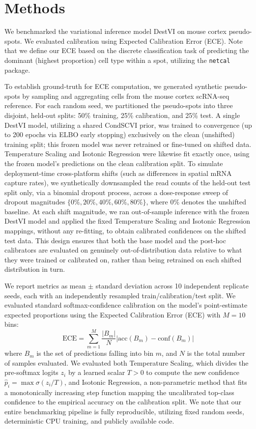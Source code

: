 \documentclass[pmlr,twocolumn,10pt]{jmlr} %
\begin{document}
\section{Methods}
\label{sec:methods}
We benchmarked the variational inference model DestVI on mouse cortex pseudo-spots. We evaluated calibration using Expected Calibration Error (ECE). Note that we define our ECE based on the discrete classification task of predicting the dominant (highest proportion) cell type within a spot, utilizing the \texttt{netcal} package.

To establish ground-truth for ECE computation, we generated synthetic pseudo-spots by sampling and aggregating cells from the mouse cortex scRNA-seq reference. For each random seed, we partitioned the pseudo-spots into three disjoint, held-out splits: 50\% training, 25\% calibration, and 25\% test. A single DestVI model, utilizing a shared CondSCVI prior, was trained to convergence (up to 200 epochs via ELBO early stopping) exclusively on the clean (unshifted) training split; this frozen model was never retrained or fine-tuned on shifted data. Temperature Scaling and Isotonic Regression were likewise fit exactly once, using the frozen model's predictions on the clean calibration split. To simulate deployment-time cross-platform shifts (such as differences in spatial mRNA capture rates), we synthetically downsampled the read counts of the held-out test split only, via a binomial dropout process, across a dose-response sweep of dropout magnitudes $\{0\%, 20\%, 40\%, 60\%, 80\%\}$, where $0\%$ denotes the unshifted baseline. At each shift magnitude, we ran out-of-sample inference with the frozen DestVI model and applied the fixed Temperature Scaling and Isotonic Regression mappings, without any re-fitting, to obtain calibrated confidences on the shifted test data. This design ensures that both the base model and the post-hoc calibrators are evaluated on genuinely out-of-distribution data relative to what they were trained or calibrated on, rather than being retrained on each shifted distribution in turn.

We report metrics as mean $\pm$ standard deviation across 10 independent replicate seeds, each with an independently resampled train/calibration/test split. We evaluated standard softmax-confidence calibration on the model's point-estimate expected proportions using the Expected Calibration Error (ECE) with $M=10$ bins:
\begin{equation}
\text{ECE} = \sum_{m=1}^{M} \frac{|B_m|}{N} \left| \text{acc}(B_m) - \text{conf}(B_m) \right|
\end{equation}
where $B_m$ is the set of predictions falling into bin $m$, and $N$ is the total number of samples evaluated. We evaluated both Temperature Scaling, which divides the pre-softmax logits $z_i$ by a learned scalar $T > 0$ to compute the new confidence $\hat{p}_i = \max \sigma(z_i / T)$, and Isotonic Regression, a non-parametric method that fits a monotonically increasing step function mapping the uncalibrated top-class confidence to the empirical accuracy on the calibration split. We note that our entire benchmarking pipeline is fully reproducible, utilizing fixed random seeds, deterministic CPU training, and publicly available code.
\end{document}
